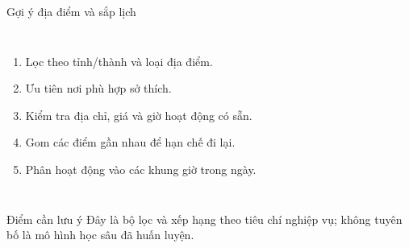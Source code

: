 \documentclass[aspectratio=169,11pt]{beamer}
\begin{document}
\begin{frame}{Gợi ý địa điểm và sắp lịch}
  \begin{columns}[T,onlytextwidth]
      \begin{enumerate}
        \item Lọc theo tỉnh/thành và loại địa điểm.
        \item Ưu tiên nơi phù hợp sở thích.
        \item Kiểm tra địa chỉ, giá và giờ hoạt động có sẵn.
        \item Gom các điểm gần nhau để hạn chế đi lại.
        \item Phân hoạt động vào các khung giờ trong ngày.
      \end{enumerate}
  \end{columns}
  \vspace{0.2cm}
  \begin{alertblock}{Điểm cần lưu ý}
    Đây là bộ lọc và xếp hạng theo tiêu chí nghiệp vụ; không tuyên bố là mô hình học sâu đã huấn luyện.
  \end{alertblock}
\end{frame}
\end{document}
